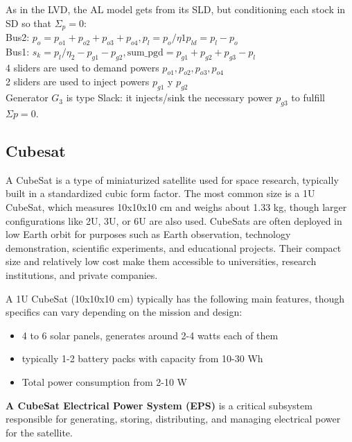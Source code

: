 \documentclass[11pt, a4paper]{article}
\theoremstyle{definition}
\theoremstyle{plain}
\theoremstyle{plain}
\theoremstyle{remark}
\theoremstyle{remark}
\theoremstyle{remark}
\begin{document}
{As in the LVD, the AL model gets from its SLD, but
conditioning each stock in SD so that $\Sigma_p = 0 $:\\
Bus2: $p_o = p_{o1} + p_{o2} + p_{o3} + p_{o4}, p_l = p_o /\eta1 p_{ld} = p_l - p_o$\\
Bus1: $s_k = p_l /\eta_2 - p_{g1} - p_{g2}, \text{sum\_pgd} = p_{g1}+p_{g2}+p_{g3}-p_l$\\
4 sliders are used to demand powers $p_{o1}, p_{o2}, p_{o3}, p_{o4}$\\
2 sliders are used to inject powers $p_{g1}$ y $p_{g2}$\\
Generator 
$G_3$ is type Slack: it injects/sink the necessary power $ p_{g3} $  to fulfill $\Sigma p =0$.

}

\subsection*{Cubesat}

{\color{blue}

A CubeSat is a type of miniaturized satellite used for space research, typically built in a standardized cubic form factor. The most common size is a 1U CubeSat, which measures 10x10x10 cm and weighs about 1.33 kg, though larger configurations like 2U, 3U, or 6U are also used. CubeSats are often deployed in low Earth orbit for purposes such as Earth observation, technology demonstration, scientific experiments, and educational projects. Their compact size and relatively low cost make them accessible to universities, research institutions, and private companies.

A 1U CubeSat (10x10x10 cm) typically has the following main features, though specifics can vary depending on the mission and design:
\begin{itemize}
	\item  4 to 6 solar panels, generates around 2-4 watts each of them
	
	\item typically 1-2 battery packs with capacity from 10-30 Wh
	
	\item Total power consumption from 2-10 W
\end{itemize}
\textbf{A CubeSat Electrical Power System (EPS)} is a critical subsystem responsible for generating, storing, distributing, and managing electrical power for the satellite. 
}
\end{document}
